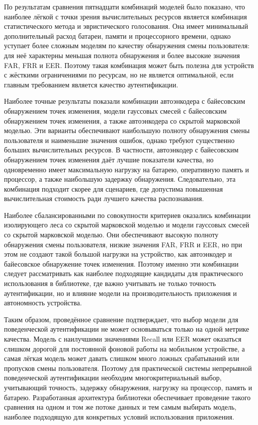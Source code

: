 \documentclass[oneside,senior,etd]{BYUPhys}
\begin{document}
По результатам сравнения пятнадцати комбинаций моделей было показано, что наиболее лёгкой с точки зрения вычислительных ресурсов является комбинация статистического метода и эвристического голосования. Она имеет минимальный дополнительный расход батареи, памяти и процессорного времени, однако уступает более сложным моделям по качеству обнаружения смены пользователя: для неё характерны меньшая полнота обнаружения и более высокие значения FAR, FRR и EER. Поэтому такая комбинация может быть полезна для устройств с жёсткими ограничениями по ресурсам, но не является оптимальной, если главным требованием является качество аутентификации.

Наиболее точные результаты показали комбинации автоэнкодера с байесовским обнаружением точек изменения, модели гауссовых смесей с байесовским обнаружением точек изменения, а также автоэнкодера со скрытой марковской моделью. Эти варианты обеспечивают наибольшую полноту обнаружения смены пользователя и наименьшие значения ошибок, однако требуют существенно больших вычислительных ресурсов. В частности, автоэнкодер с байесовским обнаружением точек изменения даёт лучшие показатели качества, но одновременно имеет максимальную нагрузку на батарею, оперативную память и процессор, а также наибольшую задержку обнаружения. Следовательно, эта комбинация подходит скорее для сценариев, где допустима повышенная вычислительная стоимость ради лучшего качества распознавания.

Наиболее сбалансированными по совокупности критериев оказались комбинации изолирующего леса со скрытой марковской моделью и модели гауссовых смесей со скрытой марковской моделью. Они обеспечивают высокую полноту обнаружения смены пользователя, низкие значения FAR, FRR и EER, но при этом не создают такой большой нагрузки на устройство, как автоэнкодер и байесовское обнаружение точек изменения. Поэтому именно эти комбинации следует рассматривать как наиболее подходящие кандидаты для практического использования в библиотеке, где важно учитывать не только точность аутентификации, но и влияние модели на производительность приложения и автономность устройства.

Таким образом, проведённое сравнение подтверждает, что выбор модели для поведенческой аутентификации не может основываться только на одной метрике качества. Модель с наилучшими значениями Recall или EER может оказаться слишком дорогой для постоянной фоновой работы на мобильном устройстве, а самая лёгкая модель может давать слишком много ложных срабатываний или пропусков смены пользователя. Поэтому для практической системы непрерывной поведенческой аутентификации необходим многокритериальный выбор, учитывающий точность, задержку обнаружения, нагрузку на процессор, память и батарею. Разработанная архитектура библиотеки обеспечивает проведение такого сравнения на одном и том же потоке данных и тем самым выбирать модель, наиболее подходящую для конкретных условий использования приложения.
\end{document}
